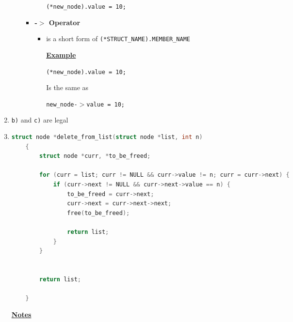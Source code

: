 \documentclass[12pt]{article}
\begin{document}
\begin{enumerate}[1.]
\begin{itemize}
\begin{itemize}
\begin{itemize}
                \bigskip

                \texttt{(*new\_node).value = 10;}

                \bigskip

            \end{itemize}
            \item \textbf{-$>$ Operator}

            \begin{itemize}
                \item is a short form of \texttt{(*STRUCT\_NAME).MEMBER\_NAME}

                \bigskip

                \underline{\textbf{Example}}

                \bigskip

                \texttt{(*new\_node).value = 10;}

                \bigskip

                Is the same as

                \bigskip

                \texttt{new\_node-$>$value = 10;}
            \end{itemize}
        \end{itemize}
    \end{itemize}

    \item

    \texttt{b)} and \texttt{c)} are legal

    \bigskip

    \item

\begin{lstlisting}[language=c]
    struct node *delete_from_list(struct node *list, int n)
    {
        struct node *curr, *to_be_freed;

        for (curr = list; curr != NULL && curr->value != n; curr = curr->next) {
            if (curr->next != NULL && curr->next->value == n) {
                to_be_freed = curr->next;
                curr->next = curr->next->next;
                free(to_be_freed);

                return list;
            }
        }


        return list;

    }
\end{lstlisting}

    \bigskip

    \underline{\textbf{Notes}}


\end{enumerate}
\end{document}
